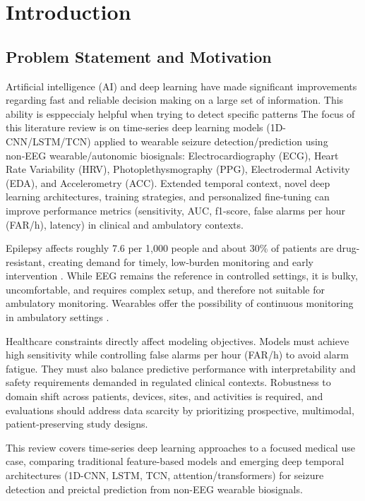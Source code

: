 \section{Introduction}

\subsection{Problem Statement and Motivation}

Artificial intelligence (AI) and deep learning have made significant improvements regarding
fast and reliable decision making on a large set of information.
This ability is esppeccialy helpful when trying to detect specific patterns
The focus of this literature review is on time‑series deep learning models (1D-CNN/LSTM/TCN)
applied to wearable seizure detection/prediction using
non‑EEG wearable/autonomic biosignals: Electrocardiography (ECG), Heart Rate Variability (HRV), 
Photoplethysmography (PPG), Electrodermal Activity (EDA), and Accelerometry (ACC).
Extended temporal context, novel deep learning architectures, training strategies, 
and personalized fine-tuning can improve performance metrics
(sensitivity, AUC, f1-score, false alarms per hour (FAR/h), latency) in clinical and ambulatory contexts.

Epilepsy affects roughly 7.6 per 1,000 people and about 30\% of
patients are drug-resistant, creating demand for timely, low‑burden
monitoring and early intervention \parencite{beghiEpidemiologyEpilepsy2019,
kwanEarlyIdentificationRefractory2000,chenNewEraPersonalised2020}.
While EEG remains the reference in controlled settings, 
it is bulky, uncomfortable, and requires complex setup, and therefore not suitable for ambulatory monitoring.
Wearables offer the possibility of
continuous monitoring in ambulatory settings \parencite{chenNewEraPersonalised2020}.

Healthcare constraints directly affect modeling objectives. 
Models must achieve high sensitivity while controlling false alarms per hour (FAR/h) to avoid alarm fatigue. 
They must also balance predictive performance with interpretability and safety requirements demanded in regulated clinical contexts. 
Robustness to domain shift across patients, devices, sites, and activities is required, 
and evaluations should address data scarcity by prioritizing prospective, multimodal, patient-preserving study designs.

This review covers time-series deep learning approaches to a focused medical use case,
comparing traditional feature-based models and emerging deep temporal
architectures (1D-CNN, LSTM, TCN, attention/transformers) for seizure
detection and preictal prediction from non-EEG wearable biosignals.

